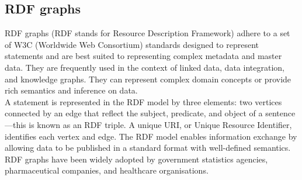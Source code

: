 \documentclass[paper=a4, fontsize=11pt]{scrartcl}
\numberwithin{equation}{section}		%
\numberwithin{figure}{section}			%
\numberwithin{table}{section}				%
\begin{document}
\subsection{RDF graphs}
RDF graphs (RDF stands for Resource Description Framework) adhere to a set of W3C (Worldwide Web Consortium) standards designed to represent statements and are best suited to representing complex metadata and master data. They are frequently used in the context of linked data, data integration, and knowledge graphs. They can represent complex domain concepts or provide rich semantics and inference on data.
\\
A statement is represented in the RDF model by three elements: two vertices connected by an edge that reflect the subject, predicate, and object of a sentence—this is known as an RDF triple. A unique URI, or Unique Resource Identifier, identifies each vertex and edge. The RDF model enables information exchange by allowing data to be published in a standard format with well-defined semantics. RDF graphs have been widely adopted by government statistics agencies, pharmaceutical companies, and healthcare organisations.

\newpage
\end{document}
